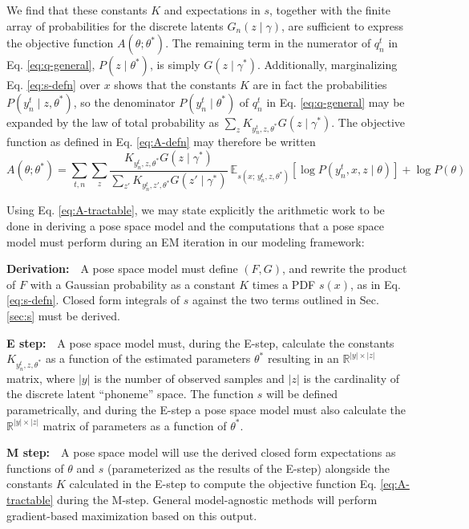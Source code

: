 \documentclass{article}         %
\newcommand{\EE}{\mathbb{E}}
\newcommand{\RR}{\mathbb{R}}
\newcommand{\bc}[1]{\left[ #1 \right]}
\begin{document}
We find that these constants $K$ and expectations in $s$, together with the finite array of probabilities for the discrete latents $G_n(z \mid \gamma)$, are sufficient to express the objective function $A(\theta; \theta^*)$. The remaining term in the numerator of $q_n^t$ in Eq. \ref{eq:q-general}, $P(z\mid \theta^*)$, is simply $G(z\mid \gamma^*)$. Additionally, marginalizing Eq. \ref{eq:s-defn} over $x$ shows that the constants $K$ are in fact the probabilities $P(y_n^t \mid z, \theta^*)$, so the denominator $P(y_n^t \mid \theta^*)$ of $q_n^t$ in Eq. \ref{eq:q-general} may be expanded by the law of total probability as $\sum_z K_{y_n^t, z, \theta^*} G(z\mid \gamma^*)$. The objective function as defined in Eq. \ref{eq:A-defn} may therefore be written
\begin{equation}
    A(\theta; \theta^*) = \sum_{t, n}\sum_z  \frac{K_{y^t_n, z, \theta^*} G(z\mid \gamma^*)}{\sum_{z'} K_{y^t_n, z', \theta^*}  G(z'\mid\gamma^*)}\ \EE_{s(x;\, y^t_n, z, \theta^*)}\bc{\log P(y^t_n, x, z \mid \theta)} + \log P(\theta) \label{eq:A-tractable}
\end{equation}

Using Eq. \ref{eq:A-tractable}, we may state explicitly the arithmetic work to be done in deriving a pose space model and the computations that a pose space model must perform during an EM iteration in our modeling framework:

\textbf{Derivation:}\ \ A pose space model must define $(F, G)$, and rewrite the product of $F$ with a Gaussian probability as a constant $K$ times a PDF $s(x)$, as in Eq. \ref{eq:s-defn}. Closed form integrals of $s$ against the two terms outlined in Sec. \ref{sec:s} must be derived.

\textbf{E step:}\ \  A pose space model must, during the E-step, calculate the constants $K_{y_n^t,z,\theta^*}$ as a function of the estimated parameters $\theta^*$ resulting in an $\RR^{|y|\times |z|}$ matrix, where $|y|$ is the number of observed samples and $|z|$ is the cardinality of the discrete latent ``phoneme'' space. The function $s$ will be defined parametrically, and during the E-step a pose space model must also calculate the $\RR^{|y|\times |z|}$ matrix of parameters as a function of $\theta^*$.

\textbf{M step:}\ \ A pose space model will use the derived closed form expectations as functions of $\theta$ and $s$ (parameterized as the results of the E-step) alongside the constants $K$ calculated in the E-step to compute the objective function Eq. \ref{eq:A-tractable} during the M-step. General model-agnostic methods will perform gradient-based maximization based on this output.
\end{document}
